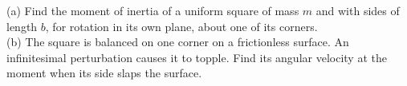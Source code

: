 (a) Find the moment of inertia of a uniform square of mass $m$ and with sides of length $b$,
for rotation in its own plane, about one of its corners.\\
(b) The square is balanced on one corner on a frictionless surface. An infinitesimal perturbation
causes it to topple. Find its angular velocity at the moment when its side slaps the surface.
